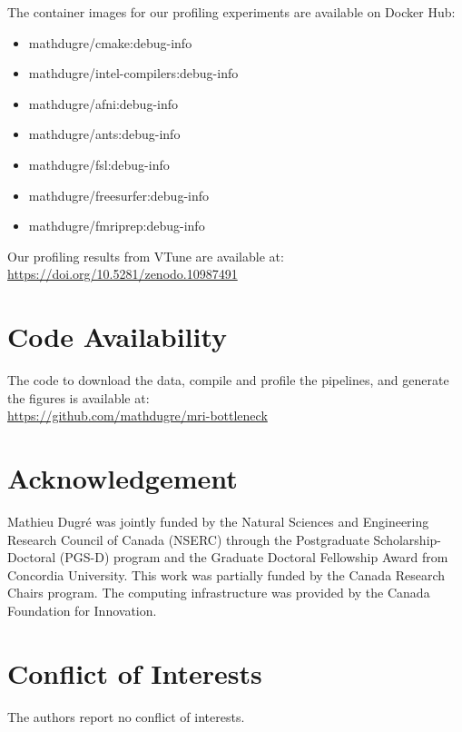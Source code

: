 \documentclass[conference]{IEEEtran}
\begin{document}
The container images for our profiling experiments are available on Docker Hub:
\begin{itemize}
	\item mathdugre/cmake:debug-info
	\item mathdugre/intel-compilers:debug-info
	\item mathdugre/afni:debug-info
	\item mathdugre/ants:debug-info
	\item mathdugre/fsl:debug-info
	\item mathdugre/freesurfer:debug-info
	\item mathdugre/fmriprep:debug-info
\end{itemize}
	
Our profiling results from VTune are available at:
\\\href{https://doi.org/10.5281/zenodo.10987491}{https://doi.org/10.5281/zenodo.10987491}

\section{Code Availability}
\label{sec:code-availability}
The code to download the data, compile and profile the pipelines, and generate the figures is available at:
\\\href{https://github.com/mathdugre/mri-bottleneck}{https://github.com/mathdugre/mri-bottleneck}
													
\section*{Acknowledgement}
Mathieu Dugr\'e was jointly funded by the Natural Sciences and Engineering Research Council of Canada (NSERC) through the Postgraduate Scholarship-Doctoral (PGS-D) program and the Graduate Doctoral Fellowship Award from Concordia University. This work was partially funded by the Canada Research Chairs program. The computing infrastructure was provided by the Canada Foundation for Innovation. 
													
\section*{Conflict of Interests}
The authors report no conflict of interests.
													

% 

													
\newpage
\onecolumn
\end{document}
